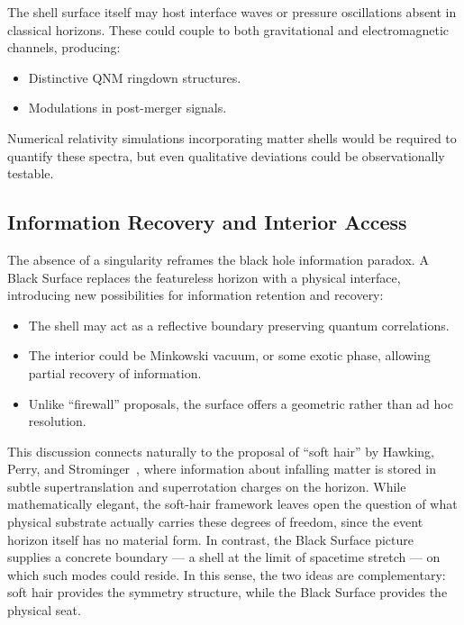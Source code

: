 \documentclass[12pt]{article}
\begin{document}
The shell surface itself may host interface waves or pressure oscillations absent in classical horizons. These could couple to both gravitational and electromagnetic channels, producing:

\begin{itemize}
    \item Distinctive QNM ringdown structures.
    \item Modulations in post-merger signals.
\end{itemize}

Numerical relativity simulations incorporating matter shells would be required to quantify these spectra, but even qualitative deviations could be observationally testable.

\subsection{Information Recovery and Interior Access}

The absence of a singularity reframes the black hole information paradox. A Black Surface replaces the featureless horizon with a physical interface, introducing new possibilities for information retention and recovery:

\begin{itemize}
    \item The shell may act as a reflective boundary preserving quantum correlations.
    \item The interior could be Minkowski vacuum, or some exotic phase, allowing partial recovery of information.
    \item Unlike ``firewall'' proposals, the surface offers a geometric rather than ad hoc resolution.
\end{itemize}

This discussion connects naturally to the proposal of ``soft hair'' by Hawking, Perry, and Strominger~\cite{hawking2016soft,hawking2018soft}, where information about infalling matter is stored in subtle supertranslation and superrotation charges on the horizon. While mathematically elegant, the soft-hair framework leaves open the question of what physical substrate actually carries these degrees of freedom, since the event horizon itself has no material form. In contrast, the Black Surface picture supplies a concrete boundary --- a shell at the limit of spacetime stretch --- on which such modes could reside. In this sense, the two ideas are complementary: soft hair provides the symmetry structure, while the Black Surface provides the physical seat.
\end{document}

